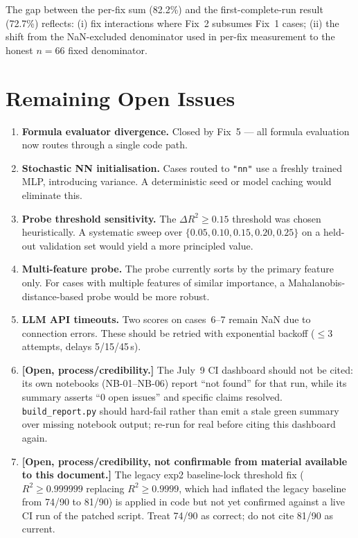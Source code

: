 \documentclass[twoside,11pt]{article}
\begin{document}
The gap between the per-fix sum (82.2\%) and the first-complete-run result
(72.7\%) reflects: (i) fix interactions where Fix~2 subsumes Fix~1 cases;
(ii) the shift from the NaN-excluded denominator used in per-fix measurement
to the honest $n{=}66$ fixed denominator.

\section{Remaining Open Issues}
\label{sec:open_issues}

\begin{enumerate}[leftmargin=*]
  \item \textbf{Formula evaluator divergence.}  Closed by Fix~5 — all formula
    evaluation now routes through a single code path.
  \item \textbf{Stochastic NN initialisation.}  Cases routed to \texttt{"nn"}
    use a freshly trained MLP, introducing variance.  A deterministic seed or
    model caching would eliminate this.
  \item \textbf{Probe threshold sensitivity.}  The $\Delta R^2 \geq 0.15$
    threshold was chosen heuristically.  A systematic sweep over
    $\{0.05, 0.10, 0.15, 0.20, 0.25\}$ on a held-out validation set would
    yield a more principled value.
  \item \textbf{Multi-feature probe.}  The probe currently sorts by the
    primary feature only.  For cases with multiple features of similar
    importance, a Mahalanobis-distance-based probe would be more robust.
  \item \textbf{LLM API timeouts.}  Two scores on cases~6--7 remain NaN
    due to connection errors.  These should be retried with exponential
    backoff ($\leq 3$ attempts, delays 5/15/45\,s).
  \item \textbf{[Open, process/credibility.]} The July~9 CI dashboard
    should not be cited: its own notebooks (NB-01--NB-06) report ``not
    found'' for that run, while its summary asserts ``0 open issues''
    and specific claims resolved. \texttt{build\_report.py} should
    hard-fail rather than emit a stale green summary over missing
    notebook output; re-run for real before citing this dashboard again.
  \item \textbf{[Open, process/credibility, not confirmable from
    material available to this document.]} The legacy exp2 baseline-lock
    threshold fix ($R^2 \geq 0.999999$ replacing $R^2 \geq 0.9999$, which
    had inflated the legacy baseline from 74/90 to 81/90) is applied in
    code but not yet confirmed against a live CI run of the patched
    script. Treat 74/90 as correct; do not cite 81/90 as current.
\end{enumerate}
\end{document}
